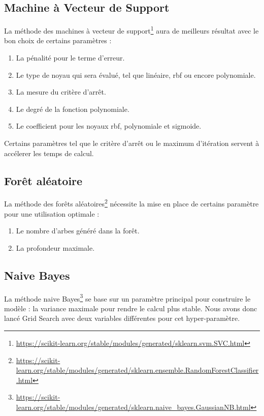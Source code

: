 \documentclass[12pt]{article}
\begin{document}
\subsection{Machine à Vecteur de Support}
La méthode des machines à vecteur de support\footnote{\url{https://scikit-learn.org/stable/modules/generated/sklearn.svm.SVC.html}} aura de meilleurs résultat avec le bon choix de certains paramètres : 
\begin{enumerate}
\item La pénalité pour le terme d'erreur.
\item Le type de noyau qui sera évalué, tel que linéaire, rbf ou encore polynomiale.
\item La mesure du critère d'arrêt.
\item Le degré de la fonction polynomiale.
\item Le coefficient pour les noyaux rbf, polynomiale et sigmoide.
\end{enumerate}
Certains paramètres tel que le critère d'arrêt ou le maximum d'itération servent à accélerer les temps de calcul. 

\subsection{Forêt aléatoire}
La méthode des forêts aléatoires\footnote{\url{https://scikit-learn.org/stable/modules/generated/sklearn.ensemble.RandomForestClassifier.html}} nécessite la mise en place de certains paramètre pour une utilisation optimale :
\begin{enumerate}
\item Le nombre d'arbes généré dans la forêt.
\item La profondeur maximale.
\end{enumerate}

\subsection{Naive Bayes}
La méthode naive Bayes\footnote{\url{https://scikit-learn.org/stable/modules/generated/sklearn.naive_bayes.GaussianNB.html}} se base sur un paramètre principal pour construire le modèle : la variance maximale pour rendre le calcul plus stable. Nous avons donc lancé Grid Search avec deux variables différentes pour cet hyper-paramètre.
\end{document}
